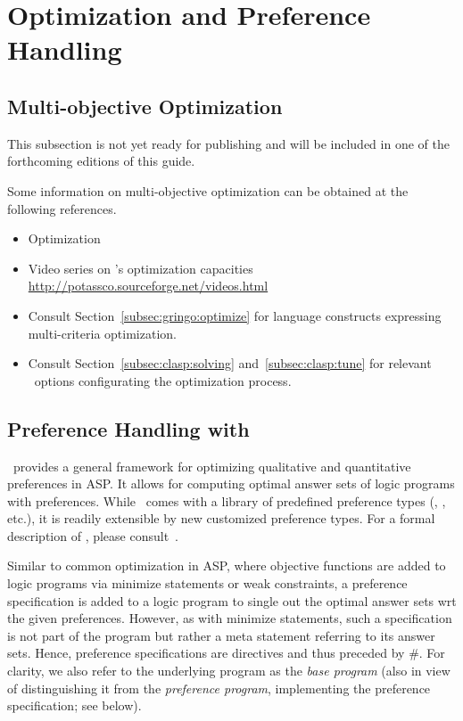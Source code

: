 
\section{Optimization and Preference Handling}
\label{sec:prefopt}

\subsection{Multi-objective Optimization}
\label{sec:oprimization}

This subsection is not yet ready for publishing
and will be included in one of the forthcoming editions of this guide.

Some information on multi-objective optimization
can be obtained at the following references.

\begin{itemize}
\item Optimization \cite{gekakasc11b,gekakasc11c,gekasc11b,ankamasc12a}
\item Video series on \clasp's optimization capacities \url{http://potassco.sourceforge.net/videos.html}
\item Consult Section~\ref{subsec:gringo:optimize} for language constructs expressing multi-criteria optimization.
\item Consult Section~\ref{subsec:clasp:solving} and~\ref{subsec:clasp:tune} for relevant \clasp\ options configurating the optimization process.
\end{itemize}

\subsection{Preference Handling with \asprin}\label{sec:asprin}
%
%
\asprin\ provides a general framework for optimizing qualitative and quantitative preferences in ASP.
It allows for computing optimal answer sets of logic programs with preferences.
While \asprin\ comes with a library of predefined preference types 
(, , etc.),
it is readily extensible by new customized preference types.
For a formal description of \asprin, please consult~\cite{brderosc15a}. 

Similar to common optimization in ASP,
where objective functions are added to logic programs
via minimize statements or weak constraints,
a preference specification is added to a logic program
to single out the optimal answer sets wrt the given preferences.
However, as with minimize statements,
such a specification is not part of the program
but rather a meta statement referring to its answer sets.
Hence, preference specifications are directives and thus preceded by \#.
For clarity, we also refer to the underlying program as the \emph{base program}
(also in view of distinguishing it from the \emph{preference program},
implementing the preference specification; see below).

